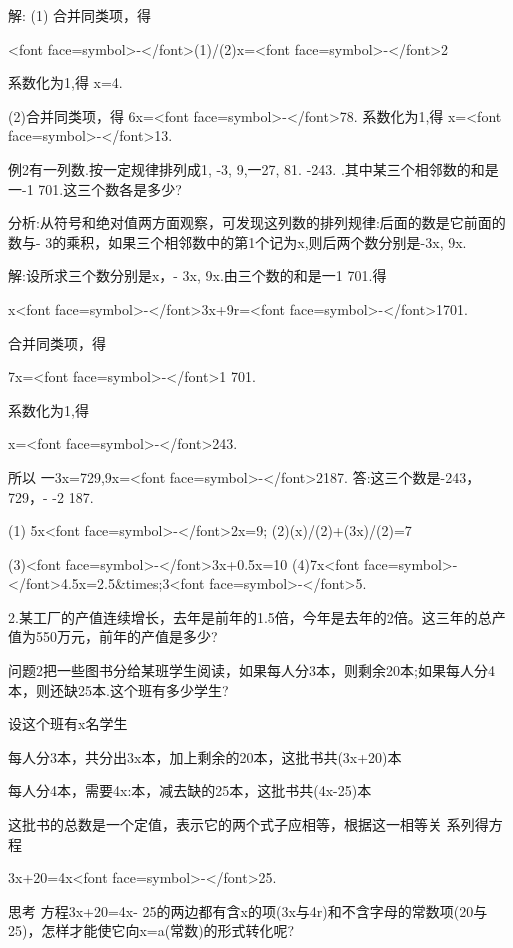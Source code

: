       解: (1) 合并同类项，得

      <font face=symbol>-</font>(1)/(2)x=<font face=symbol>-</font>2

      系数化为1,得
      x=4.

      (2)合并同类项，得
     6x=<font face=symbol>-</font>78.
      系数化为1,得
      x=<font face=symbol>-</font>13.

      例2有一列数.按一定规律排列成1, -3, 9,一27, 81. -243. .其中某三个相邻数的和是一-1 701.这三个数各是多少?

      分析:从符号和绝对值两方面观察，可发现这列数的排列规律:后面的数是它前面的数与- 3的乘积，如果三个相邻数中的第1个记为x,则后两个数分别是-3x, 9x.

      解:设所求三个数分别是x，- 3x, 9x.由三个数的和是一1 701.得

      x<font face=symbol>-</font>3x+9r=<font face=symbol>-</font>1701.

      合并同类项，得

      7x=<font face=symbol>-</font>1 701.

      系数化为1,得

      x=<font face=symbol>-</font>243.

      所以
      一3x=729,9x=<font face=symbol>-</font>2187.
      答:这三个数是-243，729，- -2 187.
      \endexample

      \beginexercise
      (1) 5x<font face=symbol>-</font>2x=9;  (2)(x)/(2)+(3x)/(2)=7

      (3)<font face=symbol>-</font>3x+0.5x=10 (4)7x<font face=symbol>-</font>4.5x=2.5&times;3<font face=symbol>-</font>5.

      2.某工厂的产值连续增长，去年是前年的1.5倍，今年是去年的2倍。这三年的总产值为550万元，前年的产值是多少?
      \endexercise

      \beginexample
      问题2把一些图书分给某班学生阅读，如果每人分3本，则剩余20本;如果每人分4本，则还缺25本.这个班有多少学生?

      设这个班有x名学生

      每人分3本，共分出3x本，加上剩余的20本，这批书共(3x+20)本

      每人分4本，需要4x:本，减去缺的25本，这批书共(4x-25)本

      这批书的总数是一个定值，表示它的两个式子应相等，根据这一相等关 系列得方程

      3x+20=4x<font face=symbol>-</font>25.

     思考
     方程3x+20=4x- 25的两边都有含x的项(3x与4r)和不含字母的常数项(20与25)，怎样才能使它向x=a(常数)的形式转化呢?

